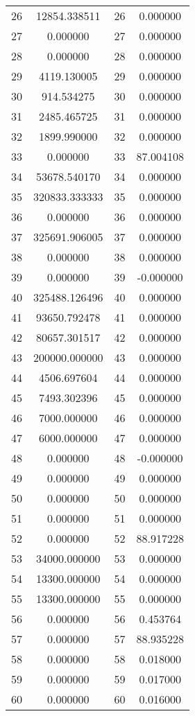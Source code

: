 \documentclass[12pt]{article}
\begin{document}
\begin{longtable}{@{}cccc@{}}
26 & 12854.338511 & 26 & 0.000000 \\
27 & 0.000000 & 27 & 0.000000 \\
28 & 0.000000 & 28 & 0.000000 \\
29 & 4119.130005 & 29 & 0.000000 \\
30 & 914.534275 & 30 & 0.000000 \\
31 & 2485.465725 & 31 & 0.000000 \\
32 & 1899.990000 & 32 & 0.000000 \\
33 & 0.000000 & 33 & 87.004108 \\
34 & 53678.540170 & 34 & 0.000000 \\
35 & 320833.333333 & 35 & 0.000000 \\
36 & 0.000000 & 36 & 0.000000 \\
37 & 325691.906005 & 37 & 0.000000 \\
38 & 0.000000 & 38 & 0.000000 \\
39 & 0.000000 & 39 & -0.000000 \\
40 & 325488.126496 & 40 & 0.000000 \\
41 & 93650.792478 & 41 & 0.000000 \\
42 & 80657.301517 & 42 & 0.000000 \\
43 & 200000.000000 & 43 & 0.000000 \\
44 & 4506.697604 & 44 & 0.000000 \\
45 & 7493.302396 & 45 & 0.000000 \\
46 & 7000.000000 & 46 & 0.000000 \\
47 & 6000.000000 & 47 & 0.000000 \\
48 & 0.000000 & 48 & -0.000000 \\
49 & 0.000000 & 49 & 0.000000 \\
50 & 0.000000 & 50 & 0.000000 \\
51 & 0.000000 & 51 & 0.000000 \\
52 & 0.000000 & 52 & 88.917228 \\
53 & 34000.000000 & 53 & 0.000000 \\
54 & 13300.000000 & 54 & 0.000000 \\
55 & 13300.000000 & 55 & 0.000000 \\
56 & 0.000000 & 56 & 0.453764 \\
57 & 0.000000 & 57 & 88.935228 \\
58 & 0.000000 & 58 & 0.018000 \\
59 & 0.000000 & 59 & 0.017000 \\
60 & 0.000000 & 60 & 0.016000 \\

\end{longtable}
\end{document}
